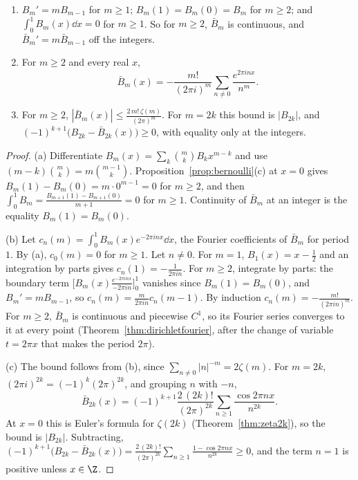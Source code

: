 \begin{lemma}\label{lem:bernoullifn}
\begin{enumerate}[label=(\alph*)]
\item $B_m'=mB_{m-1}$ for $m\ge1$; $B_m(1)=B_m(0)=B_m$ for $m\ge2$; and $\int_0^1B_m(x)\dd x=0$ for $m\ge1$. So for $m\ge2$, $\bar B_m$ is continuous,
and $\bar B_m'=m\bar B_{m-1}$ off the integers.
\item For $m\ge2$ and every real $x$,
\[
\bar B_m(x)=-\frac{m!}{(2\pi i)^m}\sum_{n\ne0}\frac{e^{2\pi inx}}{n^m}.
\]
\item For $m\ge2$, $|\bar B_m(x)|\le\frac{2\,m!\,\zeta(m)}{(2\pi)^m}$. For $m=2k$ this bound is $|B_{2k}|$, and $(-1)^{k+1}\bigl(B_{2k}-\bar B_{2k}(x)\bigr)\ge0$,
with equality only at the integers.
\end{enumerate}
\end{lemma}
\begin{proof}
(a) Differentiate $B_m(x)=\sum_k\binom mkB_kx^{m-k}$ and use $(m-k)\binom mk=m\binom{m-1}k$. Proposition~\ref{prop:bernoulli}(c) at $x=0$ gives
$B_m(1)-B_m(0)=m\cdot0^{m-1}=0$ for $m\ge2$, and then $\int_0^1B_m=\frac{B_{m+1}(1)-B_{m+1}(0)}{m+1}=0$ for $m\ge1$. Continuity of $\bar B_m$ at an integer
is the equality $B_m(1)=B_m(0)$.

(b) Let $c_n(m)=\int_0^1B_m(x)e^{-2\pi inx}\dd x$, the Fourier coefficients of $\bar B_m$ for period $1$. By (a), $c_0(m)=0$ for $m\ge1$. Let $n\ne0$. For
$m=1$, $B_1(x)=x-\frac12$ and an integration by parts gives $c_n(1)=-\frac1{2\pi in}$. For $m\ge2$, integrate by parts: the boundary term
$\bigl[B_m(x)\frac{e^{-2\pi inx}}{-2\pi in}\bigr]_0^1$ vanishes since $B_m(1)=B_m(0)$, and $B_m'=mB_{m-1}$, so $c_n(m)=\frac m{2\pi in}c_n(m-1)$. By induction
$c_n(m)=-\frac{m!}{(2\pi in)^m}$. For $m\ge2$, $\bar B_m$ is continuous and piecewise $C^1$, so its Fourier series converges to it at every point
(Theorem~\ref{thm:dirichletfourier}, after the change of variable $t=2\pi x$ that makes the period $2\pi$).

(c) The bound follows from (b), since $\sum_{n\ne0}|n|^{-m}=2\zeta(m)$. For $m=2k$, $(2\pi i)^{2k}=(-1)^k(2\pi)^{2k}$, and grouping $n$ with $-n$,
\[
\bar B_{2k}(x)=(-1)^{k+1}\frac{2\,(2k)!}{(2\pi)^{2k}}\sum_{n\ge1}\frac{\cos2\pi nx}{n^{2k}}.
\]
At $x=0$ this is Euler's formula for $\zeta(2k)$ (Theorem~\ref{thm:zeta2k}), so the bound is $|B_{2k}|$. Subtracting,
$(-1)^{k+1}\bigl(B_{2k}-\bar B_{2k}(x)\bigr)=\frac{2\,(2k)!}{(2\pi)^{2k}}\sum_{n\ge1}\frac{1-\cos2\pi nx}{n^{2k}}\ge0$, and the term $n=1$ is positive unless $x\in\Z$.
\end{proof}


